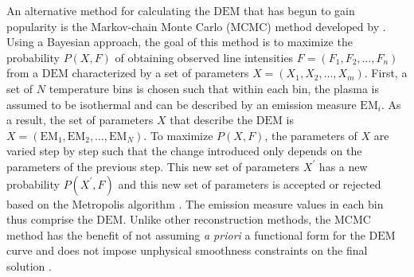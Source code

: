 %
\par An alternative method for calculating the $\mathrm{DEM}$ that has begun to gain popularity is the Markov-chain Monte Carlo (MCMC) method developed by \citet{kashyap_markov-chain_1998}. Using a Bayesian approach, the goal of this method is to maximize the probability $P(X,F)$ of obtaining observed line intensities $F=(F_1,F_2,\ldots,F_n)$ from a $\mathrm{DEM}$ characterized by a set of parameters $X=(X_1,X_2,\ldots,X_m)$. First, a set of $N$ temperature bins is chosen such that within each bin, the plasma is assumed to be isothermal and can be described by an emission measure $\mathrm{EM}_i$. As a result, the set of parameters $X$ that describe the $\mathrm{DEM}$ is $X=(\mathrm{EM}_1,\mathrm{EM}_2,\ldots,\mathrm{EM}_N)$. To maximize $P(X,F)$, the parameters of $X$ are varied step by step such that the change introduced only depends on the parameters of the previous step. This new set of parameters $X^{\prime}$ has a new probability $P(X^{\prime},F)$ and this new set of parameters is accepted or rejected based on the Metropolis algorithm \citep{metropolis_equation_1953}. The emission measure values in each bin thus comprise the $\mathrm{DEM}$. Unlike other reconstruction methods, the MCMC method has the benefit of not assuming \textit{a priori} a functional form for the $\mathrm{DEM}$ curve and does not impose unphysical smoothness constraints on the final solution \citep{landi_monte_2012}.
%

